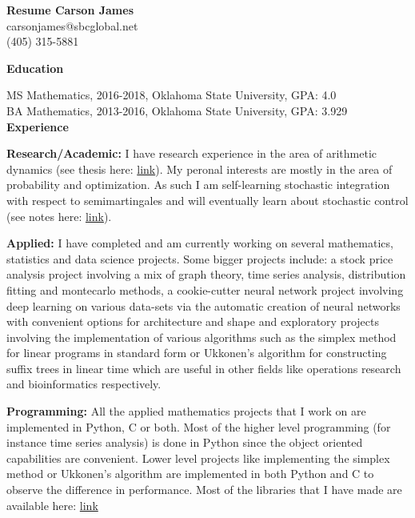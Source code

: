 \documentclass[12pt]{amsart}
\newcommand{\n}{\noindent}
\begin{document}
\textbf{\hspace{7cm}\large Resume \hspace{4cm} \large Carson James}\\ \phantom{1} \hspace{13cm} carsonjames@sbcglobal.net\\ \phantom{1} \hspace{13.9cm} (405) 315-5881


\n\textbf{\large Education} \vspace{2mm}

\n MS Mathematics, 2016-2018, Oklahoma State University, GPA: 4.0\\
\n BA Mathematics, 2013-2016, Oklahoma State University, GPA: 3.929 \vspace{.5mm}\\

 \n \textbf{\large Experience} \vspace{2mm}

\n \textbf{Research/Academic:}
I have research experience in the area of arithmetic dynamics (see thesis here: \textcolor{blue}{ \href{https://github.com/carsonaj/Math/blob/master/Arithmetic\%20Dynamics/Arithmetic\%20Dynamics\%20Notes.pdf}{link}}). My peronal interests are mostly in the area of probability and optimization. As such I am self-learning stochastic integration with respect to semimartingales and will eventually learn about stochastic control (see notes here: \textcolor{blue}{ \href{https://github.com/carsonaj/Math/blob/master/Stochastic\%20Analysis/Stochastic\%20Processes\%20-\%20James.pdf}{link}}). \vspace{2mm}


\n  \textbf{Applied:} I have completed and am currently working on several mathematics, statistics and data science projects. Some bigger projects include: a stock price analysis project involving a mix of graph theory, time series analysis, distribution fitting and montecarlo methods, a cookie-cutter neural network project involving deep learning on various data-sets via the automatic creation of neural networks with convenient options for architecture and shape and exploratory projects involving the implementation of various algorithms such as the simplex method for linear programs in standard form or Ukkonen's algorithm for constructing suffix trees in linear time which are useful in other fields like operations research and bioinformatics respectively. \vspace{2mm}

\n \textbf{Programming:} All the applied mathematics projects that I work on are implemented in Python, C or both. Most of the higher level programming (for instance time series analysis) is done in Python since the object oriented capabilities are convenient. Lower level projects like implementing the simplex method or Ukkonen's algorithm are implemented in both Python and C to observe the difference in performance. Most of the libraries that I have made are available here: \textcolor{blue}{ \href{https://github.com/carsonaj/Programming}{link}} \vspace{2mm}
\end{document}
